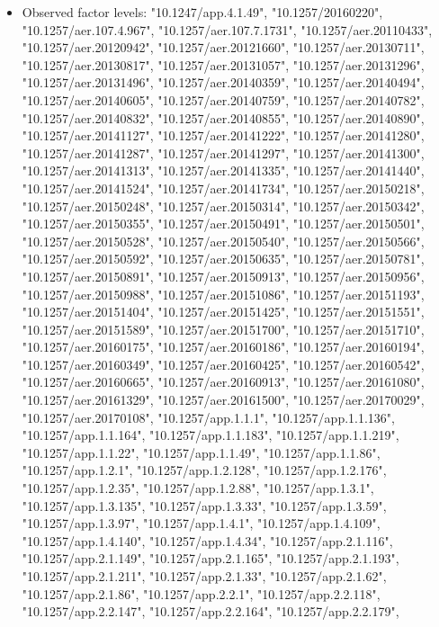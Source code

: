 \documentclass[]{article}
\providecommand{\tightlist}{%
  \setlength{\itemsep}{0pt}\setlength{\parskip}{0pt}}
\begin{document}
\begin{itemize}
\tightlist
\item
  Observed factor levels: "10.1247/app.4.1.49", "10.1257/20160220",
  "10.1257/aer.107.4.967", "10.1257/aer.107.7.1731",
  "10.1257/aer.20110433", "10.1257/aer.20120942",
  "10.1257/aer.20121660", "10.1257/aer.20130711",
  "10.1257/aer.20130817", "10.1257/aer.20131057",
  "10.1257/aer.20131296", "10.1257/aer.20131496",
  "10.1257/aer.20140359", "10.1257/aer.20140494",
  "10.1257/aer.20140605", "10.1257/aer.20140759",
  "10.1257/aer.20140782", "10.1257/aer.20140832",
  "10.1257/aer.20140855", "10.1257/aer.20140890",
  "10.1257/aer.20141127", "10.1257/aer.20141222",
  "10.1257/aer.20141280", "10.1257/aer.20141287",
  "10.1257/aer.20141297", "10.1257/aer.20141300",
  "10.1257/aer.20141313", "10.1257/aer.20141335",
  "10.1257/aer.20141440", "10.1257/aer.20141524",
  "10.1257/aer.20141734", "10.1257/aer.20150218",
  "10.1257/aer.20150248", "10.1257/aer.20150314",
  "10.1257/aer.20150342", "10.1257/aer.20150355",
  "10.1257/aer.20150491", "10.1257/aer.20150501",
  "10.1257/aer.20150528", "10.1257/aer.20150540",
  "10.1257/aer.20150566", "10.1257/aer.20150592",
  "10.1257/aer.20150635", "10.1257/aer.20150781",
  "10.1257/aer.20150891", "10.1257/aer.20150913",
  "10.1257/aer.20150956", "10.1257/aer.20150988",
  "10.1257/aer.20151086", "10.1257/aer.20151193",
  "10.1257/aer.20151404", "10.1257/aer.20151425",
  "10.1257/aer.20151551", "10.1257/aer.20151589",
  "10.1257/aer.20151700", "10.1257/aer.20151710",
  "10.1257/aer.20160175", "10.1257/aer.20160186",
  "10.1257/aer.20160194", "10.1257/aer.20160349",
  "10.1257/aer.20160425", "10.1257/aer.20160542",
  "10.1257/aer.20160665", "10.1257/aer.20160913",
  "10.1257/aer.20161080", "10.1257/aer.20161329",
  "10.1257/aer.20161500", "10.1257/aer.20170029",
  "10.1257/aer.20170108", "10.1257/app.1.1.1", "10.1257/app.1.1.136",
  "10.1257/app.1.1.164", "10.1257/app.1.1.183", "10.1257/app.1.1.219",
  "10.1257/app.1.1.22", "10.1257/app.1.1.49", "10.1257/app.1.1.86",
  "10.1257/app.1.2.1", "10.1257/app.1.2.128", "10.1257/app.1.2.176",
  "10.1257/app.1.2.35", "10.1257/app.1.2.88", "10.1257/app.1.3.1",
  "10.1257/app.1.3.135", "10.1257/app.1.3.33", "10.1257/app.1.3.59",
  "10.1257/app.1.3.97", "10.1257/app.1.4.1", "10.1257/app.1.4.109",
  "10.1257/app.1.4.140", "10.1257/app.1.4.34", "10.1257/app.2.1.116",
  "10.1257/app.2.1.149", "10.1257/app.2.1.165", "10.1257/app.2.1.193",
  "10.1257/app.2.1.211", "10.1257/app.2.1.33", "10.1257/app.2.1.62",
  "10.1257/app.2.1.86", "10.1257/app.2.2.1", "10.1257/app.2.2.118",
  "10.1257/app.2.2.147", "10.1257/app.2.2.164", "10.1257/app.2.2.179",

\end{itemize}
\end{document}
